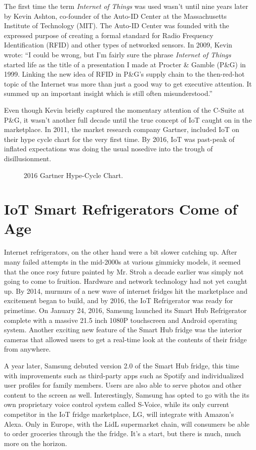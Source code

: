 \documentclass[sigconf]{acmart}
\begin{document}
The first time the term {\em Internet of Things} was used wasn't until nine years later by Kevin Ashton, co-founder of the Auto-ID Center at the Massachusetts Institute of Technology (MIT). The Auto-ID Center was founded with the expressed purpose of creating a formal standard for Radio Frequency Identification (RFID) and other types of networked sensors. In 2009, Kevin wrote\cite{Ashton01}: ``I could be wrong, but I'm fairly sure the phrase {\em Internet of Things} started life as the title of a presentation I made at Procter \& Gamble (P\&G) in 1999. Linking the new idea of RFID in P\&G's supply chain to the then-red-hot topic of the Internet was more than just a good way to get executive attention. It summed up an important insight which is still often misunderstood.''
\par
Even though Kevin briefly captured the momentary attention of the C-Suite at P\&G, it wasn't another full decade until the true concept of IoT caught on in the marketplace. In 2011, the market research company Gartner, included IoT on their hype cycle chart for the very first time. By 2016, IoT was past-peak of inflated expectations was doing the usual nosedive into the trough of disillusionment\cite{Gartner2017}.

\begin{figure}
  \caption{2016 Gartner Hype-Cycle Chart.}
  \label{fig:Gartner2016}
\end{figure}

\section{IoT Smart Refrigerators Come of Age}

Internet refrigerators, on the other hand were a bit slower catching up. After many failed attempts in the mid-2000s at various gimmicky models, it seemed that the once rosy future painted by Mr. Stroh a decade earlier was simply not going to come to fruition. Hardware and network technology had not yet caught up. By 2014, murmurs of a new wave of internet fridges hit the marketplace and excitement began to build, and by 2016, the IoT Refrigerator was ready for primetime. On January 24, 2016, Samsung launched its Smart Hub Refrigerator complete with a massive 21.5 inch 1080P touchscreen and Android operating system. Another exciting new feature of the Smart Hub fridge was the interior cameras that allowed users to get a real-time look at the contents of their fridge from anywhere\cite{PocketLint2016}.
\par
A year later, Samsung debuted version 2.0 of the Smart Hub fridge, this time with improvements such as third-party apps such as Spotify and individualized user profiles for family members. Users are also able to serve photos and other content to the screen as well. Interestingly, Samsung has opted to go with the its own proprietary voice control system called S-Voice, while its only current competitor in the IoT fridge marketplace, LG, will integrate with Amazon's Alexa. Only in Europe, with the LidL supermarket chain, will consumers be able to order groceries through the the fridge. It's a start, but there is much, much more on the horizon\cite{PocketLint2017}.
\end{document}
